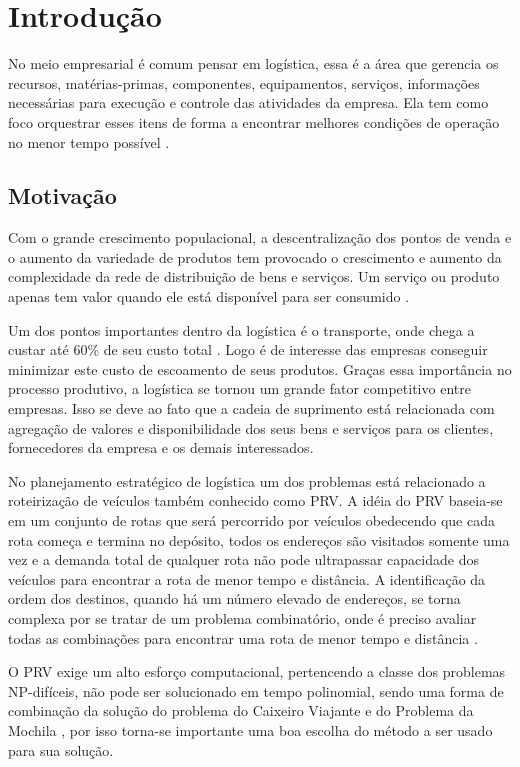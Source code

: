 \chapter[Introdução]{Introdução}

No meio empresarial é comum pensar em logística, essa é a área que gerencia os recursos, matérias-primas, componentes, equipamentos, serviços, informações necessárias para execução e controle das atividades da empresa. Ela tem como foco orquestrar esses itens de forma a encontrar melhores condições de operação no menor tempo possível \cite{DIAS}. 

\section{Motivação}

Com o grande crescimento populacional, a descentralização dos pontos de venda e o aumento da variedade de produtos tem provocado o crescimento e aumento da complexidade da rede de distribuição de bens e serviços. Um serviço ou produto apenas tem valor quando ele está disponível para ser consumido \cite{TSUDA}.

Um dos pontos importantes dentro da logística é o transporte, onde chega a custar até
60\% de seu custo total \cite{RODRIGUES}. Logo é de interesse das empresas conseguir minimizar este custo de escoamento de seus produtos. Graças essa importância no processo produtivo, a logística se tornou um grande fator competitivo entre empresas. Isso se deve ao fato que a cadeia de suprimento está relacionada com agregação de valores e disponibilidade dos seus bens e serviços para os clientes, fornecedores da empresa e os demais interessados. 

No planejamento estratégico de logística um dos problemas está relacionado a roteirização de veículos \cite{TSUDA} também conhecido como PRV. 
A idéia do PRV baseia-se em um conjunto de rotas que será percorrido por veículos obedecendo que cada rota começa e termina no depósito, todos os endereços são visitados somente uma vez e a demanda total de qualquer rota não pode ultrapassar capacidade dos veículos para encontrar a rota de menor tempo e distância. A identificação da ordem dos destinos, quando há um número elevado de endereços, se torna complexa por se tratar de um problema combinatório, onde é preciso avaliar todas as combinações para encontrar uma rota de menor tempo e distância \cite{RMKarp}.

O PRV exige um alto esforço computacional, pertencendo a classe dos problemas NP-difíceis, não pode ser solucionado em tempo polinomial, sendo uma forma de combinação da solução do problema do Caixeiro Viajante e do Problema da Mochila \cite{HUMBERTO}, por isso torna-se importante uma boa escolha do método a ser usado para sua solução.

